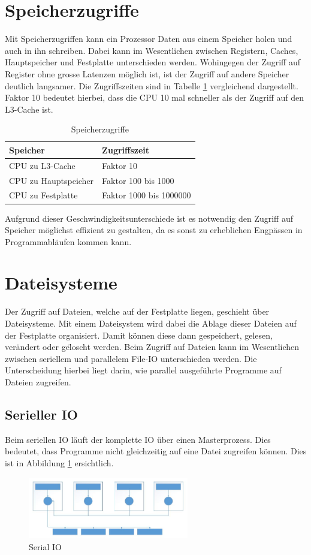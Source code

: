 \section{Speicherzugriffe}
Mit Speicherzugriffen kann ein Prozessor Daten aus einem Speicher holen und auch in ihn schreiben. Dabei kann im Wesentlichen zwischen Registern, Caches, Hauptspeicher und Festplatte unterschieden werden. Wohingegen der Zugriff auf Register ohne grosse Latenzen m\"oglich ist, ist der Zugriff auf andere Speicher deutlich langsamer. Die Zugriffszeiten sind in Tabelle \ref{tab:Speicher} vergleichend dargestellt. Faktor 10 bedeutet hierbei, dass die CPU 10 mal schneller als der Zugriff auf den L3-Cache ist. 
\begin{table}[h]
	\centering
	\begin{tabular}{l|l}
		\textbf{Speicher} & \textbf{Zugriffszeit} \\
		\hline
		CPU zu L3-Cache & Faktor 10 \\
		\hline
		CPU zu Hauptspeicher & Faktor 100 bis 1000 \\
		\hline
		CPU zu Festplatte & Faktor 1000 bis 1000000 \\
	\end{tabular}
	\caption{Speicherzugriffe}
	\label{tab:Speicher}
\end{table}

Aufgrund dieser Geschwindigkeitsunterschiede ist es notwendig den Zugriff auf Speicher m\"oglichst effizient zu gestalten, da es sonst zu erheblichen Engp\"assen in Programmabl\"aufen kommen kann.

\section{Dateisysteme}
Der Zugriff auf Dateien, welche auf der Festplatte liegen, geschieht \"uber Dateisysteme. Mit einem Dateisystem wird dabei die Ablage dieser Dateien auf der Festplatte organisiert. Damit k\"onnen diese dann gespeichert, gelesen, ver\"andert oder ge\"loscht werden.
Beim Zugriff auf Dateien kann im Wesentlichen zwischen seriellem und parallelem File-IO unterschieden werden. Die Unterscheidung hierbei liegt darin, wie parallel ausgef\"uhrte Programme auf Dateien zugreifen.
\subsection{Serieller IO}
Beim seriellen IO l\"auft der komplette IO \"uber einen Masterprozess. Dies bedeutet, dass Programme nicht gleichzeitig auf eine Datei zugreifen k\"onnen. Dies ist in Abbildung \ref{fig:serial} ersichtlich.
\begin{figure}[h]
	\centering
	\includegraphics[width=7cm]{fig/SerialIO.jpg}
	\caption{Serial IO \cite{Cazes.26.09.2013}}
	\label{fig:serial}
\end{figure}

